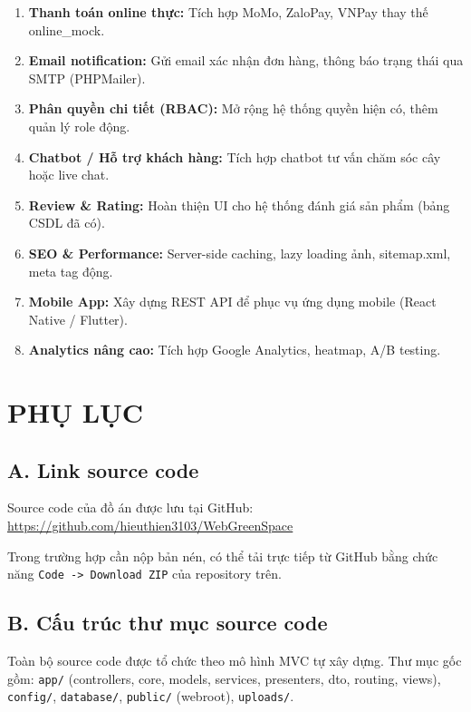\documentclass[a4paper]{article}
\begin{document}
\begin{enumerate}
    \item \textbf{Thanh toán online thực:} Tích hợp MoMo, ZaloPay, VNPay thay thế online\_mock.
    \item \textbf{Email notification:} Gửi email xác nhận đơn hàng, thông báo trạng thái qua SMTP (PHPMailer).
    \item \textbf{Phân quyền chi tiết (RBAC):} Mở rộng hệ thống quyền hiện có, thêm quản lý role động.
    \item \textbf{Chatbot / Hỗ trợ khách hàng:} Tích hợp chatbot tư vấn chăm sóc cây hoặc live chat.
    \item \textbf{Review \& Rating:} Hoàn thiện UI cho hệ thống đánh giá sản phẩm (bảng CSDL đã có).
    \item \textbf{SEO \& Performance:} Server-side caching, lazy loading ảnh, sitemap.xml, meta tag động.
    \item \textbf{Mobile App:} Xây dựng REST API để phục vụ ứng dụng mobile (React Native / Flutter).
    \item \textbf{Analytics nâng cao:} Tích hợp Google Analytics, heatmap, A/B testing.
\end{enumerate}

\section*{PHỤ LỤC}

\subsection*{A. Link source code}

Source code của đồ án được lưu tại GitHub:
\url{https://github.com/hieuthien3103/WebGreenSpace}

Trong trường hợp cần nộp bản nén, có thể tải trực tiếp từ GitHub bằng chức năng \texttt{Code -> Download ZIP} của repository trên.

\subsection*{B. Cấu trúc thư mục source code}

Toàn bộ source code được tổ chức theo mô hình MVC tự xây dựng. Thư mục gốc gồm: \texttt{app/} (controllers, core, models, services, presenters, dto, routing, views), \texttt{config/}, \texttt{database/}, \texttt{public/} (webroot), \texttt{uploads/}.
\end{document}

